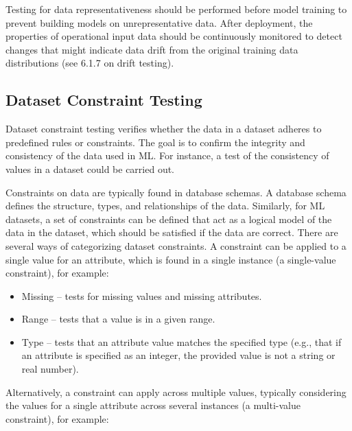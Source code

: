 \documentclass[
  letterpaper,
  DIV=11,
  numbers=noendperiod,
  oneside]{scrreprt}
\begin{document}
\begin{tcolorbox}
Testing for data representativeness should be performed before model
training to prevent building models on unrepresentative data. After
deployment, the properties of operational input data should be
continuously monitored to detect changes that might indicate data drift
from the original training data distributions (see 6.1.7 on drift
testing).

\subsection{Dataset Constraint
Testing}\label{dataset-constraint-testing}

Dataset constraint testing{} verifies whether the data in a dataset
adheres to predefined rules or constraints. The goal is to confirm the
integrity and consistency of the data used in ML. For instance, a test
of the consistency of values in a dataset could be carried out.

Constraints on data are typically found in database schemas. A database
schema defines the structure, types, and relationships of the data.
Similarly, for ML datasets, a set of constraints can be defined that act
as a logical model of the data in the dataset, which should be satisfied
if the data are correct. There are several ways of categorizing dataset
constraints. A constraint can be applied to a single value for an
attribute, which is found in a single instance (a single-value
constraint), for example:

\begin{itemize}
\item
  Missing -- tests for missing values and missing attributes.
\item
  Range -- tests that a value is in a given range.
\item
  Type -- tests that an attribute value matches the specified type
  (e.g., that if an attribute is specified as an integer, the provided
  value is not a string or real number).
\end{itemize}

Alternatively, a constraint can apply across multiple values, typically
considering the values for a single attribute across several instances
(a multi-value constraint), for example:


\end{tcolorbox}
\end{document}
